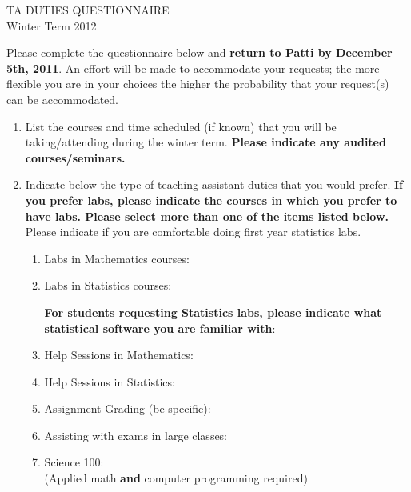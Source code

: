 \documentclass[10pt]{report}
\begin{document}
\begin{center}
{\Large TA DUTIES QUESTIONNAIRE}
\\
Winter Term 2012
\end{center}
Please complete the questionnaire below and {\bf return to Patti by
  December 5th, 2011}.  An effort will be made to accommodate your
requests; the more flexible you are in your choices the higher the
probability that your request(s) can be accommodated.

\begin{enumerate}
\item
  List the courses and time scheduled (if known) that you will be
  taking/attending during the winter term.  {\bf Please indicate any
  audited courses/seminars.}
  \TextField[maxlen=600,name=courseandseminar,
    width=\linewidth,height=1cm,align=0,multiline=true]{\\}

\item
  Indicate below the type of teaching assistant duties that you would
  prefer.  \textbf{If you prefer labs, please indicate the courses in which
  you prefer to have labs.  Please select more than one of the items
  listed below.}  Please indicate if you are comfortable doing first
  year statistics labs.
  \begin{enumerate}
  \item Labs in Mathematics courses:\hfill\TextField[width=\stringwidth,maxlen=30,name=mathlabs,align=0]{}
  \item Labs in Statistics courses:\hfill\TextField[width=\stringwidth,maxlen=30,name=statlabs,align=0]{}

  {\bf For students requesting Statistics labs, please indicate what
    statistical software you are familiar with}:\hfill
  \TextField[maxlen=30,width=\stringwidth,name=statsoft,align=0]{}
  
  \item Help Sessions in Mathematics:\hfill\TextField[width=\stringwidth,maxlen=30,name=mathhelp,align=0]{}
  \item Help Sessions in Statistics:\hfill\TextField[width=\stringwidth,maxlen=30,name=stathelp,align=0]{}
  \item Assignment Grading (be specific):\hfill\TextField[width=\stringwidth,maxlen=30,name=hwgrading,align=0]{}
  \item Assisting with exams in large classes:\hfill\TextField[width=\stringwidth,maxlen=30,name=examgrading,align=0]{}
  \item Science 100:\hfill\TextField[width=\stringwidth,maxlen=30,name=sci100,align=0]{}
    \\ (Applied math \textbf{and} computer programming required)
  \end{enumerate}


\end{enumerate}
\end{document}
